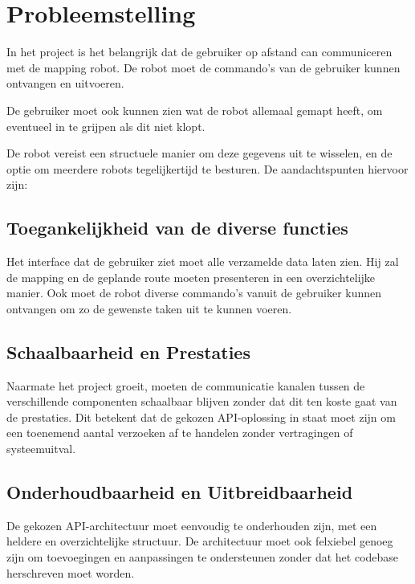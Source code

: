 \section{Probleemstelling}
\label{sec: Probleemstelling}

In het project is het belangrijk dat de gebruiker op afstand can communiceren
met de mapping robot. De robot moet de commando's van de gebruiker kunnen
ontvangen en uitvoeren.

De gebruiker moet ook kunnen zien wat de robot allemaal gemapt heeft, om
eventueel in te grijpen als dit niet klopt.

De robot vereist een structuele manier om deze gegevens uit te wisselen, en
de optie om meerdere robots tegelijkertijd te besturen. De aandachtspunten
hiervoor zijn:

\subsection{Toegankelijkheid van de diverse functies}
Het interface dat de gebruiker ziet moet alle verzamelde data laten zien.
Hij zal de mapping en de geplande route moeten presenteren in een overzichtelijke
manier. Ook moet de robot diverse commando's vanuit de gebruiker kunnen ontvangen
om zo de gewenste taken uit te kunnen voeren.

\subsection{Schaalbaarheid en Prestaties}
Naarmate het project groeit, moeten de communicatie kanalen tussen de verschillende
componenten schaalbaar blijven zonder dat dit ten koste gaat van de prestaties.
Dit betekent dat de gekozen API-oplossing in staat moet zijn om een toenemend aantal
verzoeken af te handelen zonder vertragingen of systeemuitval.

\subsection{Onderhoudbaarheid en Uitbreidbaarheid}
De gekozen API-architectuur moet eenvoudig te onderhouden zijn, met een heldere
en overzichtelijke structuur. De architectuur moet ook felxiebel genoeg zijn
om toevoegingen en aanpassingen te ondersteunen zonder dat het codebase herschreven
moet worden.
